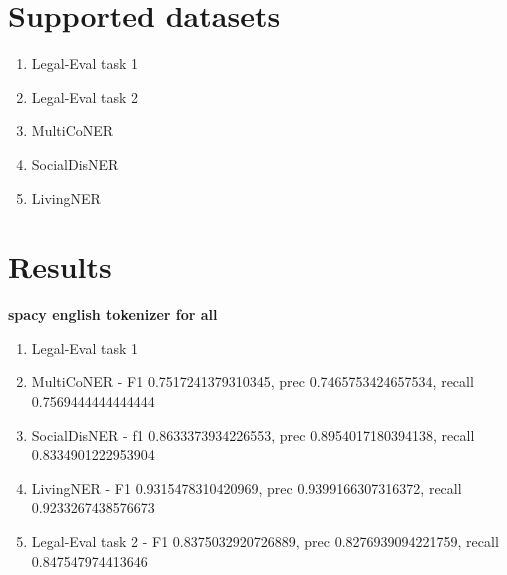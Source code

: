 \documentclass{article}
\begin{document}
\section{Supported datasets}
\begin{enumerate}
  \item Legal-Eval task 1
  \item Legal-Eval task 2
  \item MultiCoNER 
  \item SocialDisNER
  \item LivingNER
\end{enumerate}
\section{Results}
\textbf{spacy english tokenizer for all}
\begin{enumerate}
  \item Legal-Eval task 1
  \item MultiCoNER - F1 0.7517241379310345, prec 0.7465753424657534, recall 0.7569444444444444
  \item SocialDisNER - f1 0.8633373934226553, prec 0.8954017180394138, recall 0.8334901222953904
  \item LivingNER - F1 0.9315478310420969, prec 0.9399166307316372, recall 0.9233267438576673
  \item Legal-Eval task 2 - F1 0.8375032920726889, prec 0.8276939094221759, recall 0.847547974413646
\end{enumerate}
\end{document}
